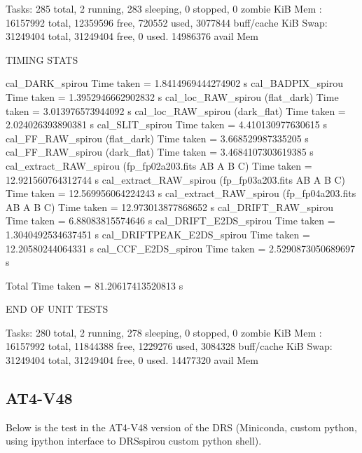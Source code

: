 \begin{cmdboxprint}
Tasks: 285 total,   2 running, 283 sleeping,   0 stopped,   0 zombie
KiB Mem : 16157992 total, 12359596 free,   720552 used,  3077844 buff/cache
KiB Swap: 31249404 total, 31249404 free,        0 used. 14986376 avail Mem

TIMING STATS

cal_DARK_spirou Time taken = 1.8414969444274902 s
cal_BADPIX_spirou Time taken = 1.3952946662902832 s
cal_loc_RAW_spirou (flat_dark) Time taken = 3.013976573944092 s
cal_loc_RAW_spirou (dark_flat) Time taken = 2.024026393890381 s
cal_SLIT_spirou Time taken = 4.410130977630615 s
cal_FF_RAW_spirou (flat_dark) Time taken = 3.668529987335205 s
cal_FF_RAW_spirou (dark_flat) Time taken = 3.4684107303619385 s
cal_extract_RAW_spirou (fp_fp02a203.fits AB A B C) Time taken = 12.921560764312744 s
cal_extract_RAW_spirou (fp_fp03a203.fits AB A B C) Time taken = 12.569956064224243 s
cal_extract_RAW_spirou (fp_fp04a203.fits AB A B C) Time taken = 12.973013877868652 s
cal_DRIFT_RAW_spirou Time taken = 6.88083815574646 s
cal_DRIFT_E2DS_spirou Time taken = 1.3040492534637451 s
cal_DRIFTPEAK_E2DS_spirou Time taken = 12.20580244064331 s
cal_CCF_E2DS_spirou Time taken = 2.5290873050689697 s

Total Time taken = 81.20617413520813 s

END OF UNIT TESTS

Tasks: 280 total,   2 running, 278 sleeping,   0 stopped,   0 zombie
KiB Mem : 16157992 total, 11844388 free,  1229276 used,  3084328 buff/cache
KiB Swap: 31249404 total, 31249404 free,        0 used. 14477320 avail Mem
\end{cmdboxprint}

\newpage
\subsection{AT4-V48}

Below is the test in the AT4-V48 version of the DRS (Miniconda, custom python, using ipython interface to DRSspirou custom python shell).

